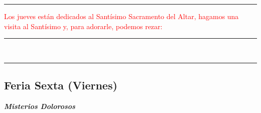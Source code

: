 \documentclass[10pt,twoside]{book}
\begin{document}
\iralfinal

\begin{center}
      {\rule{10em}{0.4pt}}

      \vspace{0.75em}

      \textcolor{red}{Los jueves están dedicados al Santísimo Sacramento del Altar, hagamos una visita al Santísimo y, para adorarle, podemos rezar:}
\end{center}

\begin{multicols}{2}
      
\end{multicols}

\begin{center}
      \begin{spacing}{0.25}
            {\rule{20em}{0.4pt}}\\
            {\rule{20em}{0.4pt}}
      \end{spacing}
\end{center}


\begin{center}
      \section*{Feria Sexta (Viernes)}

      \textbf{\textsl{\large Misterios Dolorosos}}
\end{center}

\vspace{0.5em}



\vspace{0.5em}



\vspace{0.75em}





\vspace{0.75em}





\vspace{0.75em}
\end{document}
